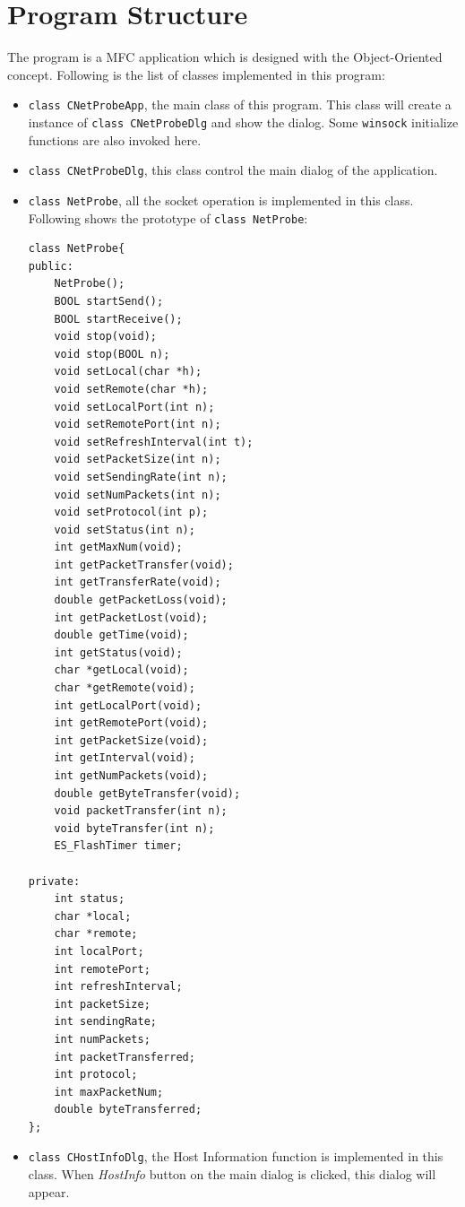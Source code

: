 \documentclass[11pt]{article}
\begin{document}
\section{Program Structure}
The program is a MFC application which is designed with the Object-Oriented concept. Following is the list of classes implemented in this program:
\begin{itemize}
\item {\tt class CNetProbeApp}, the main class of this program. This class will create a instance of {\tt class CNetProbeDlg} and show the dialog. Some {\tt winsock} initialize functions are also invoked here.
\item {\tt class CNetProbeDlg}, this class control the main dialog of the application. 
\item {\tt class NetProbe}, all the socket operation is implemented in this class. Following shows the prototype of {\tt class NetProbe}:
\begin{lstlisting}
class NetProbe{
public:
	NetProbe();
	BOOL startSend();
	BOOL startReceive();
	void stop(void);
	void stop(BOOL n);
	void setLocal(char *h);
	void setRemote(char *h);
	void setLocalPort(int n);
	void setRemotePort(int n);
	void setRefreshInterval(int t);
	void setPacketSize(int n);
	void setSendingRate(int n);
	void setNumPackets(int n);
	void setProtocol(int p);
	void setStatus(int n);
	int getMaxNum(void);
	int getPacketTransfer(void);
	int getTransferRate(void);
	double getPacketLoss(void);
	int getPacketLost(void);
	double getTime(void);
	int getStatus(void);
	char *getLocal(void);
	char *getRemote(void);
	int getLocalPort(void);
	int getRemotePort(void);
	int getPacketSize(void);
	int getInterval(void);
	int getNumPackets(void);
	double getByteTransfer(void);
	void packetTransfer(int n);
	void byteTransfer(int n);
	ES_FlashTimer timer;

private:
	int status;
	char *local;
	char *remote;
	int localPort;
	int remotePort;
	int refreshInterval;
	int packetSize;
	int sendingRate;
	int numPackets;
	int packetTransferred;
	int protocol;
	int maxPacketNum;
	double byteTransferred;
};
\end{lstlisting}
\item {\tt class CHostInfoDlg}, the Host Information function is implemented in this class. When {\em HostInfo} button on the main dialog is clicked, this dialog will appear. 
\end{itemize}
\end{document}
